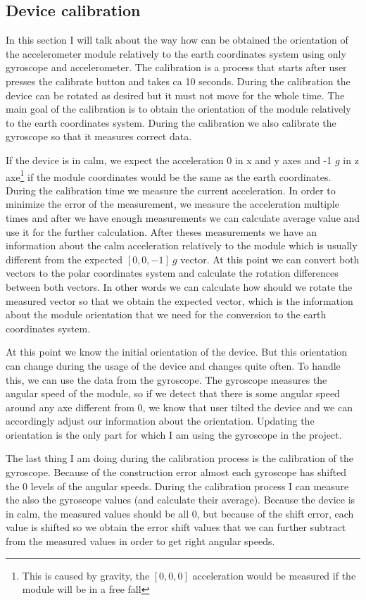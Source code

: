 \documentclass[hidelinks,a4paper]{article}
\begin{document}
\subsection{Device calibration}
In this section I will talk about the way how can be obtained the orientation of the accelerometer module relatively to the earth coordinates system using only gyroscope and accelerometer. The calibration is a process that starts after user presses the calibrate button and takes ca 10 seconds. During the calibration the device can be rotated as desired but it must not move for the whole time. The main goal of the calibration is to obtain the orientation of the module relatively to the earth coordinates system. During the calibration we also calibrate the gyroscope so that it measures correct data.\par
If the device is in calm, we expect the acceleration 0 in x and y axes and -1 $g$ in z axe\footnote{This is caused by gravity, the $[0,0,0]$ acceleration would be measured if the module will be in a free fall} if the module coordinates would be the same as the earth coordinates. During the calibration time we measure the current acceleration. In order to minimize the error of the measurement, we measure the acceleration multiple times and after we have enough measurements we can calculate average value and use it for the further calculation. After theses measurements we have an information about the calm acceleration relatively to the module which is usually different from the expected $[0,0,-1]~g$ vector. At this point we can convert both vectors to the polar coordinates system and calculate the rotation differences between both vectors. In other words we can calculate how should we rotate the measured vector so that we obtain the expected vector, which is the information about the module orientation that we need for the conversion to the earth coordinates system.\par
At this point we know the initial orientation of the device. But this orientation can change during the usage of the device and changes quite often. To handle this, we can use the data from the gyroscope. The gyroscope measures the angular speed of the module, so if we detect that there is some angular speed around any axe different from 0, we know that user tilted the device and we can accordingly adjust our information about the orientation. Updating the orientation is the only part for which I am using the gyroscope in the project.\par
The last thing I am doing during the calibration process is the calibration of the gyroscope. Because of the construction error almost each gyroscope has shifted the 0 levels of the angular speeds. During the calibration process I can measure the also the gyroscope values (and calculate their average). Because the device is in calm, the measured values should be all 0, but because of the shift error, each value is shifted so we obtain the error shift values that we can further subtract from the measured values in order to get right angular speeds. 
\end{document}
